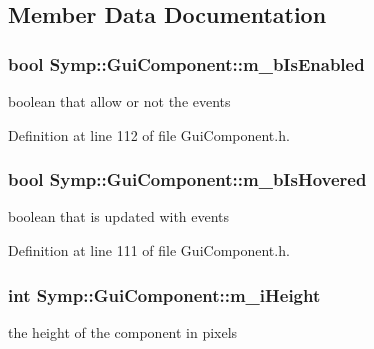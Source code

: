 \subsection{Member Data Documentation}
\hypertarget{class_symp_1_1_gui_component_af7a55b2a7e2f3e11c30a51f32571564f}{
\subsubsection[{m\-\_\-b\-Is\-Enabled}]{\setlength{\rightskip}{0pt plus 5cm}bool Symp\-::\-Gui\-Component\-::m\-\_\-b\-Is\-Enabled\hspace{0.3cm}{\ttfamily [protected]}}}\label{class_symp_1_1_gui_component_af7a55b2a7e2f3e11c30a51f32571564f}
boolean that allow or not the events 

Definition at line 112 of file Gui\-Component.\-h.

\hypertarget{class_symp_1_1_gui_component_abb0e57a2b738621ed7e4aa89bf65e44e}{
\subsubsection[{m\-\_\-b\-Is\-Hovered}]{\setlength{\rightskip}{0pt plus 5cm}bool Symp\-::\-Gui\-Component\-::m\-\_\-b\-Is\-Hovered\hspace{0.3cm}{\ttfamily [protected]}}}\label{class_symp_1_1_gui_component_abb0e57a2b738621ed7e4aa89bf65e44e}
boolean that is updated with events 

Definition at line 111 of file Gui\-Component.\-h.

\hypertarget{class_symp_1_1_gui_component_aa84bb60b7aa1adb1522c63acff2909c2}{
\subsubsection[{m\-\_\-i\-Height}]{\setlength{\rightskip}{0pt plus 5cm}int Symp\-::\-Gui\-Component\-::m\-\_\-i\-Height\hspace{0.3cm}{\ttfamily [protected]}}}\label{class_symp_1_1_gui_component_aa84bb60b7aa1adb1522c63acff2909c2}
the height of the component in pixels 

